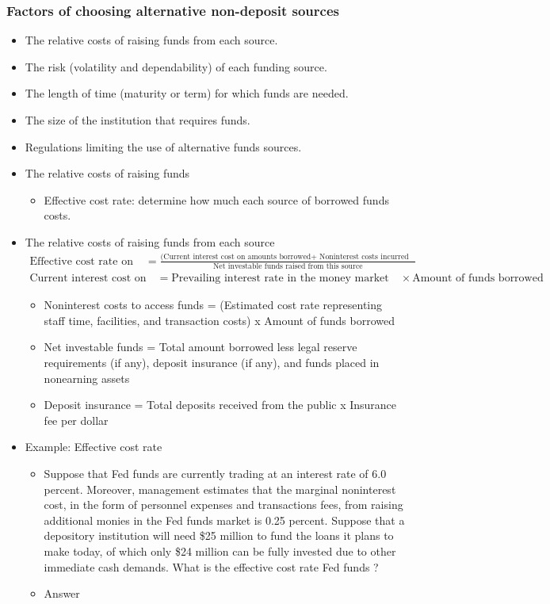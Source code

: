 \subsubsection{Factors of choosing alternative non-deposit sources}
\begin{itemize}
\item The relative costs of raising funds from each source.
\item The risk (volatility and dependability) of each funding source.
\item The length of time (maturity or term) for which funds are needed.
\item The size of the institution that requires funds.
\item Regulations limiting the use of alternative funds sources.
\item The relative costs of raising funds
    \begin{itemize}
    \item Effective cost rate: determine how much each source of borrowed funds costs.
    \end{itemize}
\item The relative costs of raising funds from each source
\begin{align*}
        \text{Effective cost rate on funds} &= \frac{\text{(Current interest cost on amounts borrowed+ Noninterest costs incurred to access these funds)}} {\text{Net investable funds raised from this source}}
        \end{align*}
 \begin{align*}
            \text{Current interest cost on amounts borrowed} &= \text{Prevailing interest rate in the money market} \quad \times \text{Amount of funds borrowed}
            \end{align*}
    \begin{itemize}
    \item Noninterest costs to access funds = (Estimated cost rate representing staff time, facilities, and transaction costs) x Amount of funds borrowed
    \item Net investable funds = Total amount borrowed less legal reserve requirements (if any), deposit insurance (if any), and funds placed in nonearning assets
    \item Deposit insurance = Total deposits received from the public x Insurance fee per dollar
    \end{itemize}
\item Example: Effective cost rate
    \begin{itemize}
    \item Suppose that Fed funds are currently trading at an interest rate of 6.0 percent. Moreover, management estimates that the marginal noninterest cost, in the form of personnel expenses and transactions fees, from raising additional monies in the Fed funds market is 0.25 percent. Suppose that a depository institution will need \$25 million to fund the loans it plans to make today, of which only \$24 million can be fully invested due to other immediate cash demands. What is the effective cost rate Fed funds ?
    \item Answer
    

\end{itemize}
\end{itemize}
